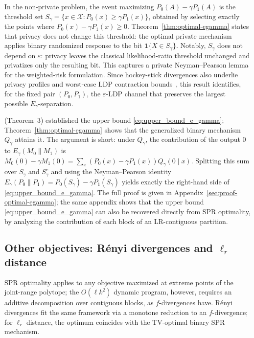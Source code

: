 \documentclass{article}
\theoremstyle{plain}
\theoremstyle{definition}
\theoremstyle{plain}
\newcommand{\eps}{\varepsilon}
\newcommand{\X}{\mathcal{X}}
\begin{document}
In the non-private problem, the event maximizing $P_0(A)-\gamma P_1(A)$ is the threshold set $S_\gamma=\{x\in\X:P_0(x)\ge\gamma P_1(x)\}$, obtained by selecting exactly the points where $P_0(x)-\gamma P_1(x)\ge 0$. Theorem~\ref{thm:optimal-egamma} states that privacy does not change this threshold: the optimal private mechanism applies binary randomized response to the bit $\mathbf 1\{X\in S_\gamma\}$. Notably, $S_\gamma$ does not depend on $\varepsilon$: privacy leaves the classical likelihood-ratio threshold unchanged and privatizes only the resulting bit. This captures a private Neyman--Pearson lemma for the weighted-risk formulation. Since hockey-stick divergences also underlie privacy profiles and worst-case LDP contraction bounds~\cite{Balle2020PrivacyProfiles,Asoodeh2021EGammaContraction}, this result identifies, for the fixed pair $(P_0,P_1)$, the $\eps$-LDP channel that preserves the largest possible $E_\gamma$-separation.

\citet{Zamanlooy2024E_gammaMixing} (Theorem~3) established the upper bound \eqref{eq:upper_bound_e_gamma}; Theorem~\ref{thm:optimal-egamma} shows that the generalized binary mechanism $Q_\gamma$ attains it. The argument is short: under $Q_\gamma$, the contribution of the output $0$ to $E_\gamma(M_0\|M_1)$ is $M_0(0)-\gamma M_1(0)=\sum_x(P_0(x)-\gamma P_1(x))Q_\gamma(0\mid x)$. Splitting this sum over $S_\gamma$ and $S_\gamma^c$ and using the Neyman--Pearson identity $E_\gamma(P_0\|P_1)=P_0(S_\gamma)-\gamma P_1(S_\gamma)$ yields exactly the right-hand side of \eqref{eq:upper_bound_e_gamma}. The full proof is given in Appendix~\ref{sec:proof-optimal-egamma}; the same appendix shows that the upper bound \eqref{eq:upper_bound_e_gamma} can also be recovered directly from SPR optimality, by analyzing the contribution of each block of an LR-contiguous partition.

\subsection{Other objectives: R\'enyi divergences and \texorpdfstring{$\ell_r$ distance}{l-r distance}}
\label{sec:main-results-other}

SPR optimality applies to any objective maximized at extreme points of the joint-range polytope; the $O(\ell k^2)$ dynamic program, however, requires an additive decomposition over contiguous blocks, as $f$-divergences have. R\'enyi divergences fit the same framework via a monotone reduction to an $f$-divergence; for $\ell_r$ distance, the optimum coincides with the TV-optimal binary SPR mechanism.
\end{document}
